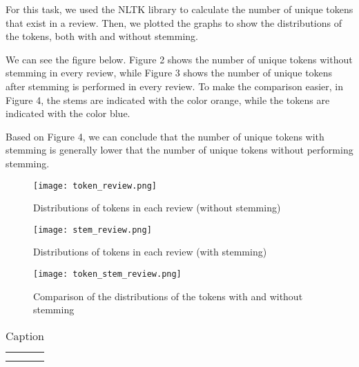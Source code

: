For this task, we used the NLTK library to calculate the number of unique tokens that exist in a review. Then, we plotted the graphs to show the distributions of the tokens, both with and without stemming.

We can see the figure below. Figure 2 shows the number of unique tokens without stemming in every review, while Figure 3 shows the number of unique tokens after stemming is performed in every review. To make the comparison easier, in Figure 4, the stems are indicated with the color orange, while the tokens are indicated with the color blue.

Based on Figure 4, we can conclude that the number of unique tokens with stemming is generally lower that the number of unique tokens without performing stemming.

\begin{figure}
    \caption{Distributions of tokens in each review (without stemming)}
    \texttt{[image: token\_review.png]}
    \label{fig:tokenized_review}
\end{figure}

\begin{figure}
    \caption{Distributions of tokens in each review (with stemming)}
    \texttt{[image: stem\_review.png]}
    \label{fig:stemmed_token_review}
\end{figure}

\begin{figure}
    \caption{Comparison of the distributions of the tokens with and without stemming}
    \texttt{[image: token\_stem\_review.png]}
    \label{fig:stem_and_token_review}
\end{figure}

\begin{table}[]
    \centering
    \begin{tabular}{c|c}
         &  \\
         & 
    \end{tabular}
    \caption{Caption}
    \label{tab:my_label}
\end{table}